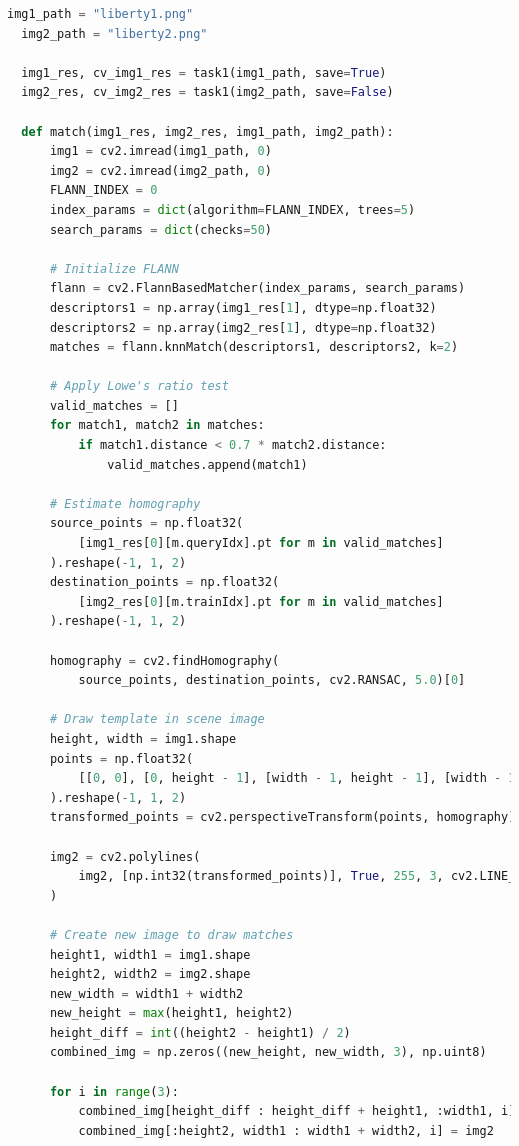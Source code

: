\documentclass[11pt,a4paper]{article}
\begin{document}
\newpage

\begin{lstlisting}[language=Python, caption=Matching keypoints]
  img1_path = "liberty1.png"
  img2_path = "liberty2.png"

  img1_res, cv_img1_res = task1(img1_path, save=True)
  img2_res, cv_img2_res = task1(img2_path, save=False)

  def match(img1_res, img2_res, img1_path, img2_path):
      img1 = cv2.imread(img1_path, 0)
      img2 = cv2.imread(img2_path, 0)
      FLANN_INDEX = 0
      index_params = dict(algorithm=FLANN_INDEX, trees=5)
      search_params = dict(checks=50)

      # Initialize FLANN
      flann = cv2.FlannBasedMatcher(index_params, search_params)
      descriptors1 = np.array(img1_res[1], dtype=np.float32)
      descriptors2 = np.array(img2_res[1], dtype=np.float32)
      matches = flann.knnMatch(descriptors1, descriptors2, k=2)

      # Apply Lowe's ratio test
      valid_matches = []
      for match1, match2 in matches:
          if match1.distance < 0.7 * match2.distance:
              valid_matches.append(match1)

      # Estimate homography
      source_points = np.float32(
          [img1_res[0][m.queryIdx].pt for m in valid_matches]
      ).reshape(-1, 1, 2)
      destination_points = np.float32(
          [img2_res[0][m.trainIdx].pt for m in valid_matches]
      ).reshape(-1, 1, 2)

      homography = cv2.findHomography(
          source_points, destination_points, cv2.RANSAC, 5.0)[0]

      # Draw template in scene image
      height, width = img1.shape
      points = np.float32(
          [[0, 0], [0, height - 1], [width - 1, height - 1], [width - 1, 0]]
      ).reshape(-1, 1, 2)
      transformed_points = cv2.perspectiveTransform(points, homography)

      img2 = cv2.polylines(
          img2, [np.int32(transformed_points)], True, 255, 3, cv2.LINE_AA
      )

      # Create new image to draw matches
      height1, width1 = img1.shape
      height2, width2 = img2.shape
      new_width = width1 + width2
      new_height = max(height1, height2)
      height_diff = int((height2 - height1) / 2)
      combined_img = np.zeros((new_height, new_width, 3), np.uint8)

      for i in range(3):
          combined_img[height_diff : height_diff + height1, :width1, i] = img1
          combined_img[:height2, width1 : width1 + width2, i] = img2


\end{lstlisting}
\end{document}
